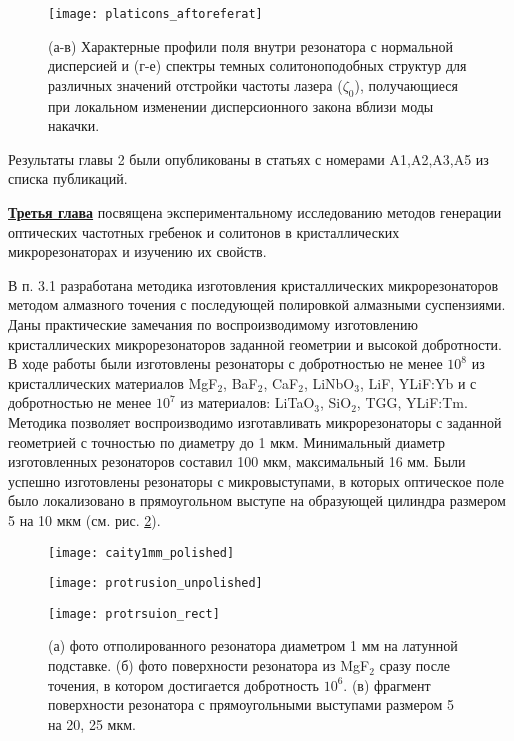 \begin{figure}[!htb]
  \centering
  \texttt{[image: platicons\_aftoreferat]}
  \setlength{\belowcaptionskip}{1pt}
  \caption{(а-в) Характерные профили поля внутри резонатора с нормальной дисперсией и (г-е) спектры темных солитоноподобных структур для различных значений отстройки частоты лазера ($\zeta_0$), получающиеся при локальном изменении дисперсионного закона вблизи моды накачки.}
  \label{platicons}
\end{figure}

Результаты главы 2 были опубликованы в статьях с номерами A1,A2,A3,A5 из списка публикаций.

\underline{\textbf{Третья глава}} посвящена экспериментальному исследованию методов генерации оптических частотных гребенок и солитонов в кристаллических микрорезонаторах и изучению их свойств.

В п. 3.1 разработана методика изготовления кристаллических микрорезонаторов методом алмазного точения с последующей полировкой алмазными суспензиями. Даны практические замечания по воспроизводимому изготовлению кристаллических микрорезонаторов заданной геометрии и высокой добротности. В ходе работы были изготовлены резонаторы с добротностью не менее $10^8$ из кристаллических материалов MgF$_2$, BaF$_2$, CaF$_2$, LiNbO$_3$, LiF, YLiF:Yb и с добротностью не менее $10^7$ из материалов: LiTaO$_3$, SiO$_2$, TGG, YLiF:Tm. Методика позволяет воспроизводимо изготавливать микрорезонаторы с заданной геометрией с точностью по диаметру до 1 мкм. Минимальный диаметр изготовленных резонаторов составил 100 мкм, максимальный 16 мм. Были успешно изготовлены резонаторы с микровыступами, в которых оптическое поле было локализовано в прямоугольном выступе на образующей цилиндра размером 5 на 10 мкм (см. рис. \ref{cavity_polished}).

\begin{figure}[!htb]
  \begin{minipage}{0.32\linewidth}\centering
    \texttt{[image: caity1mm\_polished]}
  \end{minipage}
  \hfill
  \begin{minipage}{0.32\linewidth}\centering
    \texttt{[image: protrusion\_unpolished]}
  \end{minipage}
  \hfill
  \begin{minipage}{0.32\linewidth}\centering
    \texttt{[image: protrsuion\_rect]}
  \end{minipage}
  \setlength{\belowcaptionskip}{1pt}
  \caption{(а) фото отполированного резонатора диаметром 1 мм на латунной подставке. (б) фото поверхности резонатора из MgF$_2$ сразу после точения, в котором достигается добротность $10^6$. (в) фрагмент поверхности резонатора с прямоугольными выступами размером 5 на 20, 25 мкм.}
  \label{cavity_polished}
\end{figure}

